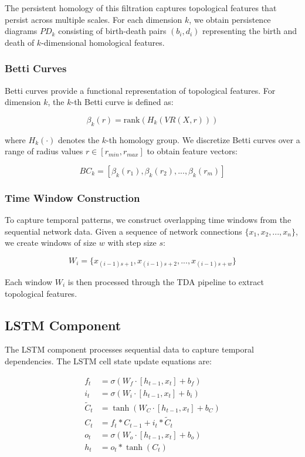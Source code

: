 \documentclass[conference]{IEEEtran}
\begin{document}
The persistent homology of this filtration captures topological features that persist across multiple scales. For each dimension $k$, we obtain persistence diagrams $PD_k$ consisting of birth-death pairs $(b_i, d_i)$ representing the birth and death of $k$-dimensional homological features.

\subsubsection{Betti Curves}

Betti curves provide a functional representation of topological features. For dimension $k$, the $k$-th Betti curve is defined as:

\begin{equation}
\beta_k(r) = \text{rank}(H_k(VR(X,r)))
\end{equation}

where $H_k(\cdot)$ denotes the $k$-th homology group. We discretize Betti curves over a range of radius values $r \in [r_{min}, r_{max}]$ to obtain feature vectors:

\begin{equation}
BC_k = [\beta_k(r_1), \beta_k(r_2), ..., \beta_k(r_m)]
\end{equation}

\subsubsection{Time Window Construction}

To capture temporal patterns, we construct overlapping time windows from the sequential network data. Given a sequence of network connections $\{x_1, x_2, ..., x_n\}$, we create windows of size $w$ with step size $s$:

\begin{equation}
W_i = \{x_{(i-1)s+1}, x_{(i-1)s+2}, ..., x_{(i-1)s+w}\}
\end{equation}

Each window $W_i$ is then processed through the TDA pipeline to extract topological features.

\subsection{LSTM Component}

The LSTM component processes sequential data to capture temporal dependencies. The LSTM cell state update equations are:

\begin{align}
f_t &= \sigma(W_f \cdot [h_{t-1}, x_t] + b_f) \\
i_t &= \sigma(W_i \cdot [h_{t-1}, x_t] + b_i) \\
\tilde{C}_t &= \tanh(W_C \cdot [h_{t-1}, x_t] + b_C) \\
C_t &= f_t * C_{t-1} + i_t * \tilde{C}_t \\
o_t &= \sigma(W_o \cdot [h_{t-1}, x_t] + b_o) \\
h_t &= o_t * \tanh(C_t)
\end{align}
\end{document}

